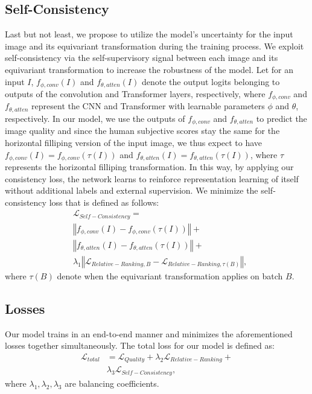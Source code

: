 \documentclass[10pt,twocolumn,letterpaper]{article}
\begin{document}
\vspace{-0.2 cm}
\subsection{Self-Consistency}
\label{S3.5}
Last but not least, we propose to utilize the model's uncertainty for the
input image and its equivariant transformation during the training process.
We exploit  self-consistency via the self-supervisory signal between
each image and its equivariant transformation  to increase the robustness 
of the model. 
Let for an input $I$, $f_{\phi,conv}(I)$ and $f_{\theta,atten}(I)$  denote the output logits  
 belonging to outputs of the convolution   and Transformer layers, respectively, where $f_{\phi,conv}$ and $f_{\theta,atten}$ represent the CNN and Transformer  with learnable parameters $\phi$ and $\theta$, respectively. 
 In our model, we use the outputs of  $f_{\phi,conv} $ and $f_{\theta,atten}$ to predict the image quality and since the human subjective scores stay the same for the horizontal filliping version of the input image, we thus expect to have $f_{\phi,conv}(I)=f_{\phi,conv}(\tau(I))$ and $f_{\theta,atten}(I)=f_{\theta,atten}(\tau(I))$, where $\tau$ represents the horizontal filliping transformation. 
 In this way, by applying our consistency loss, the network  learns to reinforce representation learning of itself without   additional labels and external supervision.
We minimize the self-consistency loss that is defined as follows:
\begin{equation}
  \begin{aligned}
     & \mathcal{L}_{Self-Consistency}=\\
     & \left\Vert f_{\phi,conv}(I)-f_{\phi,conv}(\tau(I))\right\Vert +\\
     & \left\Vert f_{\theta,atten}(I)-f_{\theta,atten}(\tau(I))\right\Vert +\\
     & \lambda_{1}\left\Vert \mathcal{L}_{Relative-Ranking,B}-\mathcal{L}_{Relative-Ranking,\tau(B)}\right\Vert,
    \end{aligned}
\end{equation}
where $\tau(B)$ denote when   the equivariant transformation applies on  batch $B$.



\subsection{Losses}
Our model trains in an end-to-end manner and minimizes the aforementioned losses together simultaneously.
The total  loss for our   model is defined as:
\begin{equation}
\begin{array}{lll}
\mathcal{L}_{total}& =\mathcal{L}_{Quality}+\lambda_{2}\mathcal{L}_{Relative-Ranking}+\\
& \lambda_{3} \mathcal{L}_{Self-Consistency},
\end{array}
\end{equation}
where $\lambda_{1},\lambda_{2},\lambda_{3}$  are balancing coefficients.
\end{document}
